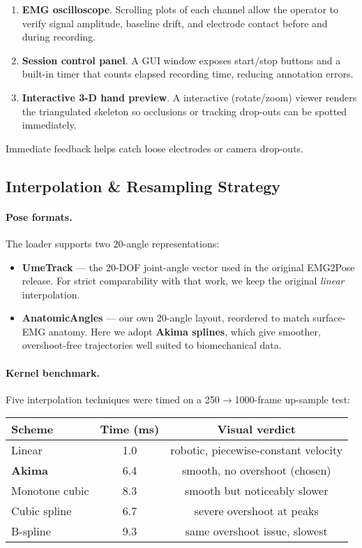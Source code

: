 \begin{enumerate}[label=\alph*]
    \item \textbf{EMG oscilloscope}.  
          Scrolling plots of each channel allow the operator to verify signal amplitude, baseline drift, and electrode contact before and during recording.
    \item \textbf{Session control panel}.  
          A GUI window exposes start/stop buttons and a built-in timer that counts elapsed recording time, reducing annotation errors.
    \item \textbf{Interactive 3-D hand preview}.  
          A interactive (rotate/zoom) viewer renders the triangulated skeleton so occlusions or tracking drop-outs can be spotted immediately.
\end{enumerate}

Immediate feedback helps catch loose electrodes or camera drop-outs.

\subsection{Interpolation \& Resampling Strategy}

\paragraph{Pose formats.}
The loader supports two 20-angle representations:

\begin{itemize}
  \item \textbf{UmeTrack} — the 20-DOF joint-angle vector used in the original
        EMG2Pose release.  For strict comparability with that work, we keep the
        original \emph{linear} interpolation.
  \item \textbf{AnatomicAngles} — our own 20-angle layout, reordered to match
        surface-EMG anatomy.  Here we adopt \textbf{Akima splines}, which give
        smoother, overshoot-free trajectories well suited to biomechanical
        data.
\end{itemize}

\paragraph{Kernel benchmark.}
Five interpolation techniques were timed on a 250$\to$1000-frame up-sample test:

\begin{center}\small
\begin{tabular}{@{}lcc@{}}
\toprule
Scheme            & Time (ms) & Visual verdict \\ \midrule
Linear            & 1.0  & robotic, piecewise-constant velocity \\
\textbf{Akima}    & 6.4  & smooth, no overshoot (chosen) \\
Monotone cubic    & 8.3  & smooth but noticeably slower \\
Cubic spline      & 6.7  & severe overshoot at peaks \\
B-spline          & 9.3  & same overshoot issue, slowest \\ \bottomrule
\end{tabular}
\end{center}

